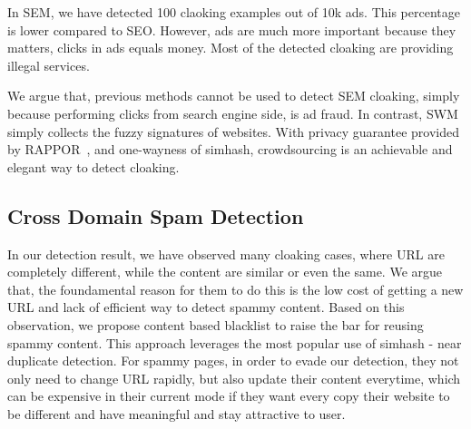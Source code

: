 In SEM, we have detected 100 claoking examples out of 10k ads. This percentage
is lower compared to SEO. However, ads are much more important because they
matters, clicks in ads equals money. Most of the detected cloaking are providing
illegal services.

We argue that, previous methods cannot be used to detect SEM cloaking, simply
because performing clicks from search engine side, is ad fraud. In contrast,
SWM simply collects the fuzzy signatures of websites. With privacy guarantee
provided by RAPPOR~\cite{erlingsson2014rappor}, and one-wayness of simhash,
crowdsourcing is an achievable and elegant way to detect cloaking.

\subsection{Cross Domain Spam Detection}
In our detection result, we have observed many cloaking cases, where URL are
completely different, while the content are similar or even the same.
We argue that, the foundamental reason for them to do this is the low cost of
getting a new URL and lack of efficient way to detect spammy content.
Based on this observation, we propose content based blacklist to raise the bar
for reusing spammy content. This approach leverages the most popular use of
simhash - near duplicate detection. For spammy pages, in order to evade our
detection, they not only need to change URL rapidly, but also update their
content everytime, which can be expensive in their current mode if they want
every copy their website to be different and have meaningful and stay attractive
to user.



